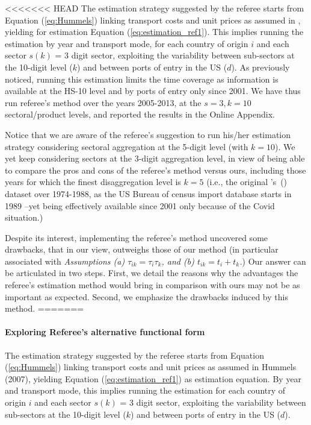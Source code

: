 \documentclass[a4paper,11pt]{article}
\newcommand\cites[1]{\citeauthor{#1}'s\ (\citeyear{#1})}
\begin{document}
<<<<<<< HEAD
The estimation strategy suggested by the referee starts from Equation (\ref{eq:Hummels}) linking transport costs and unit prices as assumed in \citet{hummels2010}, yielding for estimation Equation (\ref{eq:estimation_ref1}). This implies running the estimation by year and transport mode, for each country of origin $i$ and each sector $s(k)$ = 3 digit sector, exploiting the variability between sub-sectors at the 10-digit level ($k$) and between ports of entry in the US ($d$). As previously noticed, running this estimation limits the time coverage as information is available at the HS-10 level and by ports of entry only since 2001. We have thus run referee's method over the years 2005-2013, at the $s=3, k=10$ sectoral/product levels, and reported the results in the Online Appendix.

Notice that we are aware of the referee's suggestion to run his/her estimation strategy considering sectoral aggregation at the 5-digit level (with $k=10$). We yet keep considering sectors at the 3-digit aggregation level, in view of being able to compare the pros and cons of the referee's method versus ours, including those years for which the finest disaggregation level is $k=5$ (i.e., the original \cites{hummels2007} dataset over 1974-1988, as the US Bureau of census import database starts in 1989 --yet being effectively available since 2001 only because of the Covid situation.) %

Despite its interest, implementing the referee's method uncovered some drawbacks, that in our view, outweighs those of our method (in particular associated with \textit{Assumptions (a) $\tau_{ik} = \tau_i\tau_{k}$, and (b) $t_{ik} = t_i+ t_{k}$.}) Our answer can be articulated in two steps. First, we detail the reasons why the advantages the referee's estimation method would bring in comparison with ours may not be as important as expected. Second, we emphasize the drawbacks induced by this method. \smallskip
=======

\paragraph{Exploring Referee's alternative functional form \label{subsec:functional_form}}

The estimation strategy suggested by the referee starts from Equation (\ref{eq:Hummels}) linking transport costs and unit prices as assumed in Hummels (2007), yielding Equation (\ref{eq:estimation_ref1}) as estimation equation. By year and transport mode, this implies running the estimation for each country of origin $i$ and each sector $s(k)$ = 3 digit sector, exploiting the variability between sub-sectors at the 10-digit level ($k$) and between ports of entry in the US ($d$).
\end{document}
